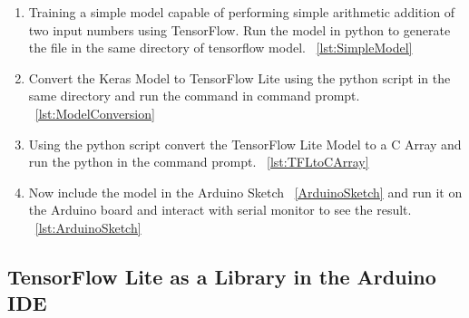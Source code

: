 \begin{enumerate}
    \item Training a simple model capable of performing simple arithmetic addition of two input numbers using TensorFlow. Run the model in python to generate the file  in the same directory of tensorflow model. ~\ref{lst:SimpleModel}
    
    
    
    
    \item Convert the Keras Model to TensorFlow Lite using the python script in the same directory and run the command  in command prompt.  ~\ref{lst:ModelConversion}
    
    
    
    \item Using the python script convert the TensorFlow Lite Model to a C Array and run the python  in the command prompt.  ~\ref{lst:TFLtoCArray}
    
    
    
    
    \item Now include the model in the Arduino Sketch ~\ref{ArduinoSketch} and run it on the Arduino board and interact with serial monitor to see the result. ~\ref{lst:ArduinoSketch}
    
    
    
    
\end{enumerate}






\subsection{TensorFlow Lite as a Library in the Arduino IDE}

